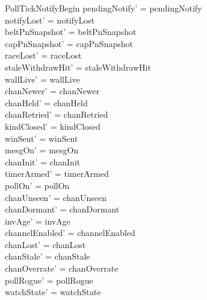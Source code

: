 \documentclass[a4paper,10pt,fleqn]{article}
\begin{document}
\begin{schema}{PollTickNotifyBegin}
  pendingNotify' = pendingNotify \\
  notifyLost' = notifyLost \\
  beltPnSnapshot' = beltPnSnapshot \\
  capPnSnapshot' = capPnSnapshot \\
  raceLost' = raceLost \\
  staleWithdrawHit' = staleWithdrawHit \\
  wallLive' = wallLive \\
  chanNewer' = chanNewer \\
  chanHeld' = chanHeld \\
  chanRetried' = chanRetried \\
  kindClosed' = kindClosed \\
  winSent' = winSent \\
  mesgOn' = mesgOn \\
  chanInit' = chanInit \\
  timerArmed' = timerArmed \\
  pollOn' = pollOn \\
  chanUnseen' = chanUnseen \\
  chanDormant' = chanDormant \\
  invAge' = invAge \\
  channelEnabled' = channelEnabled \\
  chanLost' = chanLost \\
  chanStale' = chanStale \\
  chanOverrate' = chanOverrate \\
  pollRogue' = pollRogue \\
  watchState' = watchState
\end{schema}
\end{document}

